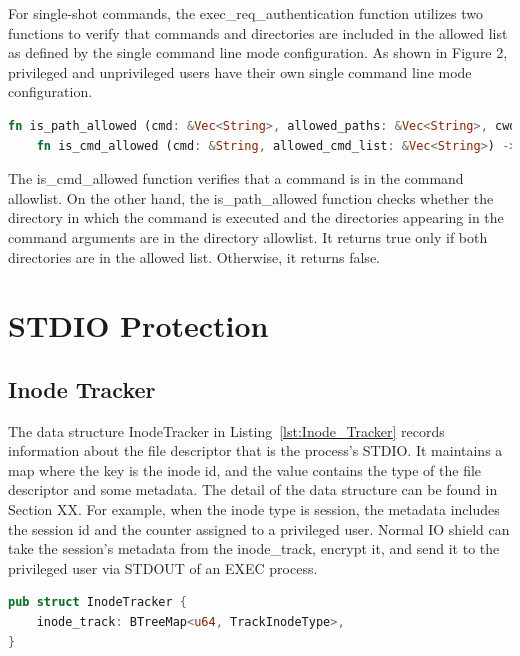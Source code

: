 For single-shot commands, the exec\_req\_authentication function utilizes two functions to verify that commands and directories are included in the allowed list as defined by the single command line mode configuration. As shown in Figure 2, privileged and unprivileged users have their own single 
command line mode configuration.


\begin{lstlisting}[language=rust, caption= API of EXEC checker, label={lst:exec_Cheker_sighlr}]
    fn is_path_allowed (cmd: &Vec<String>, allowed_paths: &Vec<String>, cwd: &str) -> bool
    fn is_cmd_allowed (cmd: &String, allowed_cmd_list: &Vec<String>) ->bool 
\end{lstlisting}
    

The is\_cmd\_allowed function verifies that a command is in the command allowlist. On the other hand, the is\_path\_allowed function checks whether the directory in which the command is executed and the directories appearing in the command arguments are in the directory allowlist. It returns true 
only if both directories are in the allowed list. Otherwise, it returns false.



\section{STDIO Protection}

\subsection{Inode Tracker}
The data structure InodeTracker in Listing~\ref{lst:Inode_Tracker} records information about the file descriptor that is the process’s STDIO. It maintains a map where the key is the inode id, and the value contains the type of the file descriptor and some metadata. 
The detail of the data structure can be found in Section XX. For example, when the inode type is session, the metadata includes the session id and the counter assigned to a privileged user. Normal IO shield can take the session's metadata from the inode\_track, encrypt it, and send it to
the privileged user via STDOUT of an EXEC process.
\begin{lstlisting}[language=rust, caption= API of Inode Tracker, label={lst:Inode_Tracker}]
pub struct InodeTracker {
    inode_track: BTreeMap<u64, TrackInodeType>,
} 
\end{lstlisting}

